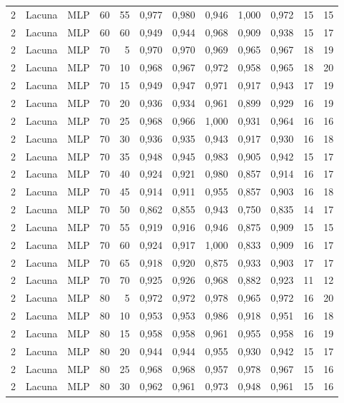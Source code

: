 \begin{longtable}{@{}rllrrrrrrrrr@{}}
2 & Lacuna & MLP & 60 & 55 & 0,977 & 0,980 & 0,946 & 1,000 & 0,972 & 15 & 15 \\
2 & Lacuna & MLP & 60 & 60 & 0,949 & 0,944 & 0,968 & 0,909 & 0,938 & 15 & 17 \\
2 & Lacuna & MLP & 70 & 5 & 0,970 & 0,970 & 0,969 & 0,965 & 0,967 & 18 & 19 \\
2 & Lacuna & MLP & 70 & 10 & 0,968 & 0,967 & 0,972 & 0,958 & 0,965 & 18 & 20 \\
2 & Lacuna & MLP & 70 & 15 & 0,949 & 0,947 & 0,971 & 0,917 & 0,943 & 17 & 19 \\
2 & Lacuna & MLP & 70 & 20 & 0,936 & 0,934 & 0,961 & 0,899 & 0,929 & 16 & 19 \\
2 & Lacuna & MLP & 70 & 25 & 0,968 & 0,966 & 1,000 & 0,931 & 0,964 & 16 & 16 \\
2 & Lacuna & MLP & 70 & 30 & 0,936 & 0,935 & 0,943 & 0,917 & 0,930 & 16 & 18 \\
2 & Lacuna & MLP & 70 & 35 & 0,948 & 0,945 & 0,983 & 0,905 & 0,942 & 15 & 17 \\
2 & Lacuna & MLP & 70 & 40 & 0,924 & 0,921 & 0,980 & 0,857 & 0,914 & 16 & 17 \\
2 & Lacuna & MLP & 70 & 45 & 0,914 & 0,911 & 0,955 & 0,857 & 0,903 & 16 & 18 \\
2 & Lacuna & MLP & 70 & 50 & 0,862 & 0,855 & 0,943 & 0,750 & 0,835 & 14 & 17 \\
2 & Lacuna & MLP & 70 & 55 & 0,919 & 0,916 & 0,946 & 0,875 & 0,909 & 15 & 15 \\
2 & Lacuna & MLP & 70 & 60 & 0,924 & 0,917 & 1,000 & 0,833 & 0,909 & 16 & 17 \\
2 & Lacuna & MLP & 70 & 65 & 0,918 & 0,920 & 0,875 & 0,933 & 0,903 & 17 & 17 \\
2 & Lacuna & MLP & 70 & 70 & 0,925 & 0,926 & 0,968 & 0,882 & 0,923 & 11 & 12 \\
2 & Lacuna & MLP & 80 & 5 & 0,972 & 0,972 & 0,978 & 0,965 & 0,972 & 16 & 20 \\
2 & Lacuna & MLP & 80 & 10 & 0,953 & 0,953 & 0,986 & 0,918 & 0,951 & 16 & 18 \\
2 & Lacuna & MLP & 80 & 15 & 0,958 & 0,958 & 0,961 & 0,955 & 0,958 & 16 & 19 \\
2 & Lacuna & MLP & 80 & 20 & 0,944 & 0,944 & 0,955 & 0,930 & 0,942 & 15 & 17 \\
2 & Lacuna & MLP & 80 & 25 & 0,968 & 0,968 & 0,957 & 0,978 & 0,967 & 15 & 16 \\
2 & Lacuna & MLP & 80 & 30 & 0,962 & 0,961 & 0,973 & 0,948 & 0,961 & 15 & 16 \\

\end{longtable}
